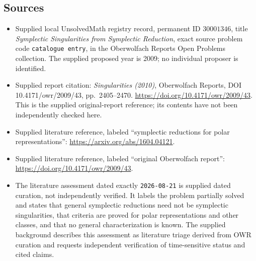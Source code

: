 \documentclass[11pt]{article}
\begin{document}
\subsection{Sources}
\begin{itemize}
\item Supplied local UnsolvedMath registry record, permanent ID \(30001346\), title \emph{Symplectic Singularities from Symplectic Reduction}, exact source problem code \texttt{catalogue entry}, in the Oberwolfach Reports Open Problems collection. The supplied proposed year is 2009; no individual proposer is identified.
\item Supplied report citation: \emph{Singularities (2010)}, Oberwolfach Reports, DOI 10.4171/owr/2009/43, pp.\ 2405--2470. \url{https://doi.org/10.4171/owr/2009/43}. This is the supplied original-report reference; its contents have not been independently checked here.
\item Supplied literature reference, labeled ``symplectic reductions for polar representations'': \url{https://arxiv.org/abs/1604.04121}.
\item Supplied literature reference, labeled ``original Oberwolfach report'': \url{https://doi.org/10.4171/owr/2009/43}.
\item The literature assessment dated exactly \texttt{2026-08-21} is supplied dated curation, not independently verified. It labels the problem partially solved and states that general symplectic reductions need not be symplectic singularities, that criteria are proved for polar representations and other classes, and that no general characterization is known. The supplied background describes this assessment as literature triage derived from OWR curation and requests independent verification of time-sensitive status and cited claims.
\end{itemize}
\end{document}
